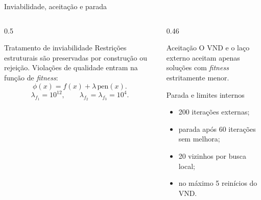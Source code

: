 \documentclass[aspectratio=169]{beamer}
\begin{document}
\begin{frame}{Inviabilidade, aceitação e parada}
\begin{columns}[T]
    \begin{column}{0.5\textwidth}
        \begin{block}{Tratamento de inviabilidade}
            Restrições estruturais são preservadas por construção ou rejeição.
            Violações de qualidade entram na função de \textit{fitness}:
            \[
                \phi(x) = f(x) + \lambda\,\mathrm{pen}(x).
            \]
            \[
                \lambda_{f_1}=10^{12},\qquad
                \lambda_{f_2}=\lambda_{f_3}=10^4.
            \]
        \end{block}
    \end{column}

    \begin{column}{0.46\textwidth}
        \begin{exampleblock}{Aceitação}
            O VND e o laço externo aceitam apenas soluções com \textit{fitness}
            estritamente menor.
        \end{exampleblock}

        \begin{alertblock}{Parada e limites internos}
            \begin{itemize}
                \item 200 iterações externas;
                \item parada após 60 iterações sem melhora;
                \item 20 vizinhos por busca local;
                \item no máximo 5 reinícios do VND.
            \end{itemize}
        \end{alertblock}
    \end{column}
\end{columns}
\end{frame}

\end{document}
